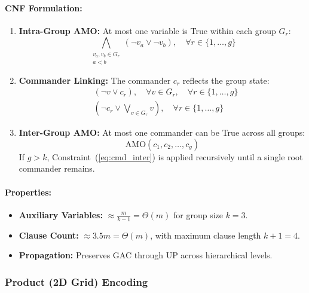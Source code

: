 \documentclass[a4paper,fleqn]{cas-sc}
\begin{document}
\paragraph{CNF Formulation:}
\begin{enumerate}
    \item \textbf{Intra-Group AMO:} At most one variable is True within each group $G_r$:
    \begin{equation}
        \bigwedge_{\substack{v_a, v_b \in G_r \\ a < b}} (\neg v_a \vee \neg v_b), \quad \forall r \in \{1, \dots, g\} \label{eq:cmd_intra}
    \end{equation}
    \item \textbf{Commander Linking:} The commander $c_r$ reflects the group state:
    \begin{align}
        & (\neg v \vee c_r), \quad \forall v \in G_r, \quad \forall r \in \{1, \dots, g\} \label{eq:cmd_link1} \\
        & \left( \neg c_r \vee \bigvee_{v \in G_r} v \right), \quad \forall r \in \{1, \dots, g\} \label{eq:cmd_link2}
    \end{align}
    \item \textbf{Inter-Group AMO:} At most one commander can be True across all groups:
    \begin{equation}
        \text{AMO}(c_1, c_2, \dots, c_g) \label{eq:cmd_inter}
    \end{equation}
    If $g > k$, Constraint~(\ref{eq:cmd_inter}) is applied recursively until a single root commander remains.
\end{enumerate}
\paragraph{Properties:}
\begin{itemize}
    \item \textbf{Auxiliary Variables:} $\approx \frac{m}{k - 1} = \Theta(m)$ for group size $k = 3$.
    \item \textbf{Clause Count:} $\approx 3.5m = \Theta(m)$, with maximum clause length $k + 1 = 4$.
    \item \textbf{Propagation:} Preserves GAC through UP across hierarchical levels.
\end{itemize}

\subsubsection{Product (2D Grid) Encoding}
\end{document}
